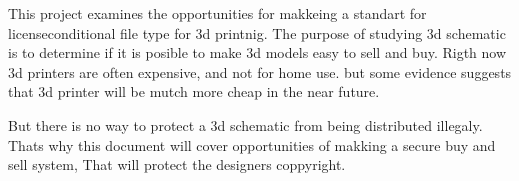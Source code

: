 This project examines the opportunities for makkeing a standart for licenseconditional file type for 3d printnig.
The purpose of studying 3d schematic is to determine if it is posible to make 3d models easy to sell and buy.
Rigth now 3d printers are often expensive, and not for home use. but some evidence suggests that 3d printer will be mutch more cheap in the near future.

But there is no way to protect a 3d schematic from being distributed illegaly. Thats why this document will cover opportunities of makking a secure buy and sell system, That will protect the designers coppyright.